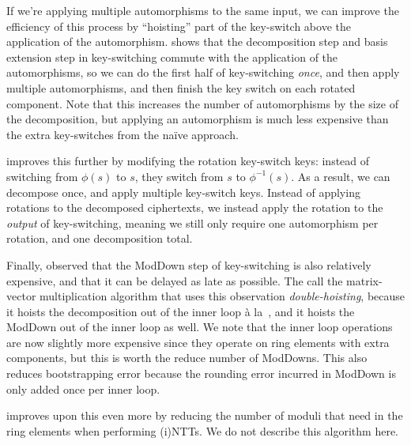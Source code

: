 \documentclass[../fheimpl.tex]{subfiles}
\begin{document}
	If we're applying multiple automorphisms to the same input, we can improve the efficiency of this process by ``hoisting'' part of the key-switch above the application of the automorphism. \cite{cryptoeprint:2018/244} shows that the decomposition step and basis extension step in key-switching commute with the application of the automorphisms, so we can do the first half of key-switching \emph{once}, and then apply multiple automorphisms, and then finish the key switch on each rotated component. Note that this increases the number of automorphisms by the size of the decomposition, but applying an automorphism is much less expensive than the extra key-switches from the na\"ive approach.
	
	\cite{cryptoeprint:2020/1203} improves this further by modifying the rotation key-switch keys: instead of switching from $\phi(s)$ to $s$, they switch from $s$ to $\phi^{-1}(s)$. As a result, we can decompose once, and apply multiple key-switch keys. Instead of applying rotations to the decomposed ciphertexts, we instead apply the rotation to the \emph{output} of key-switching, meaning we still only require one automorphism per rotation, and one decomposition total.
	
	Finally, \cite{cryptoeprint:2020/1203} observed that the ModDown step of key-switching is also relatively expensive, and that it can be delayed as late as possible. The call the matrix-vector multiplication algorithm that uses this observation \emph{double-hoisting}, because it hoists the decomposition out of the inner loop \`{a} la~\cite{cryptoeprint:2018/244}, and it hoists the ModDown out of the inner loop as well. We note that the inner loop operations are now slightly more expensive since they operate on ring elements with extra components, but this is worth the reduce number of ModDowns. This also reduces bootstrapping error because the rounding error incurred in ModDown is only added once per inner loop.

    \cite{cryptoeprint:2025/429} improves upon this even more by reducing the number of moduli that need in the ring elements when performing (i)NTTs. We do not describe this algorithm here.
	
\end{document}
